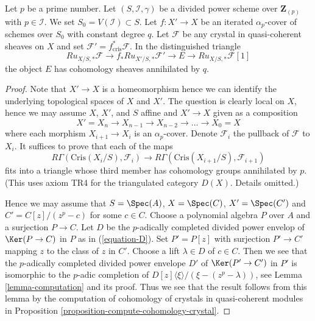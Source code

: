\begin{lemma}
\label{lemma-pullback-along-p-power-cover}
Let $p$ be a prime number. Let $(S, \mathcal{I}, \gamma)$ be a divided power
scheme over $\mathbf{Z}_{(p)}$ with $p \in \mathcal{I}$. We set
$S_0 = V(\mathcal{I}) \subset S$. Let $f : X' \to X$ be an iterated
$\alpha_p$-cover of schemes over $S_0$ with constant degree $q$. Let
$\mathcal{F}$ be any crystal in quasi-coherent sheaves on $X$ and set
$\mathcal{F}' = f_{\text{cris}}^*\mathcal{F}$.
In the distinguished triangle
$$
Ru_{X/S, *}\mathcal{F}
\longrightarrow
f_*Ru_{X'/S, *}\mathcal{F}'
\longrightarrow
E
\longrightarrow
Ru_{X/S, *}\mathcal{F}[1]
$$
the object $E$ has cohomology sheaves annihilated by $q$.
\end{lemma}

\begin{proof}
Note that $X' \to X$ is a homeomorphism hence we can identify the underlying
topological spaces of $X$ and $X'$. The question is clearly local on $X$,
hence we may assume $X$, $X'$, and $S$ affine and $X' \to X$ given as a
composition
$$
X' = X_n \to X_{n - 1} \to X_{n - 2} \to \ldots \to X_0 = X
$$
where each morphism $X_{i + 1} \to X_i$ is an $\alpha_p$-cover.
Denote $\mathcal{F}_i$ the pullback of $\mathcal{F}$ to $X_i$.
It suffices to prove that each of the maps
$$
R\Gamma(\text{Cris}(X_i/S), \mathcal{F}_i)
\longrightarrow
R\Gamma(\text{Cris}(X_{i + 1}/S), \mathcal{F}_{i + 1})
$$
fits into a triangle whose third member has cohomology groups annihilated
by $p$. (This uses axiom TR4 for the triangulated category $D(X)$. Details
omitted.)

\medskip\noindent
Hence we may assume that $S = \Spec(A)$, $X = \Spec(C)$, $X' = \Spec(C')$
and $C' = C[z]/(z^p - c)$ for some $c \in C$. Choose a polynomial algebra
$P$ over $A$ and a surjection $P \to C$. Let $D$ be the $p$-adically completed
divided power envelop of $\Ker(P \to C)$ in $P$ as in (\ref{equation-D}).
Set $P' = P[z]$ with surjection $P' \to C'$ mapping $z$ to the class of $z$
in $C'$. Choose a lift $\lambda \in D$ of $c \in C$. Then we see that
the $p$-adically completed divided power envelope $D'$ of
$\Ker(P' \to C')$ in $P'$ is isomorphic to the $p$-adic completion of
$D[z]\langle \xi \rangle/(\xi - (z^p - \lambda))$, see
Lemma \ref{lemma-computation} and its proof.
Thus we see that the result follows from this lemma
by the computation of cohomology of crystals in quasi-coherent modules in
Proposition \ref{proposition-compute-cohomology-crystal}.
\end{proof}

